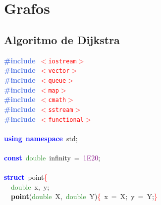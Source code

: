 \documentclass[10pt,a4paper,twoside]{article}
\begin{document}
{{{%


\section{Grafos}
\subsection{Algoritmo de Dijkstra}
{\ttfamily \raggedright {
\noindent
\mbox{}\textbf{\textcolor{RoyalBlue}{\#include}}\ \texttt{\textcolor{Red}{$<$iostream$>$}} \\
\mbox{}\textbf{\textcolor{RoyalBlue}{\#include}}\ \texttt{\textcolor{Red}{$<$vector$>$}} \\
\mbox{}\textbf{\textcolor{RoyalBlue}{\#include}}\ \texttt{\textcolor{Red}{$<$queue$>$}} \\
\mbox{}\textbf{\textcolor{RoyalBlue}{\#include}}\ \texttt{\textcolor{Red}{$<$map$>$}} \\
\mbox{}\textbf{\textcolor{RoyalBlue}{\#include}}\ \texttt{\textcolor{Red}{$<$cmath$>$}} \\
\mbox{}\textbf{\textcolor{RoyalBlue}{\#include}}\ \texttt{\textcolor{Red}{$<$sstream$>$}} \\
\mbox{}\textbf{\textcolor{RoyalBlue}{\#include}}\ \texttt{\textcolor{Red}{$<$functional$>$}} \\
\mbox{} \\
\mbox{}\textbf{\textcolor{Blue}{using}}\ \textbf{\textcolor{Blue}{namespace}}\ std\textcolor{BrickRed}{;} \\
\mbox{} \\
\mbox{}\textbf{\textcolor{Blue}{const}}\ \textcolor{ForestGreen}{double}\ infinity\ \textcolor{BrickRed}{=}\ \textcolor{Purple}{1E20}\textcolor{BrickRed}{;} \\
\mbox{} \\
\mbox{}\textbf{\textcolor{Blue}{struct}}\ point\textcolor{Red}{\{} \\
\mbox{}\ \ \textcolor{ForestGreen}{double}\ x\textcolor{BrickRed}{,}\ y\textcolor{BrickRed}{;} \\
\mbox{}\ \ \textbf{\textcolor{Black}{point}}\textcolor{BrickRed}{(}\textcolor{ForestGreen}{double}\ X\textcolor{BrickRed}{,}\ \textcolor{ForestGreen}{double}\ Y\textcolor{BrickRed}{)}\textcolor{Red}{\{}\ x\ \textcolor{BrickRed}{=}\ X\textcolor{BrickRed}{;}\ y\ \textcolor{BrickRed}{=}\ Y\textcolor{BrickRed}{;}\textcolor{Red}{\}} \\
}}}}}
\end{document}
